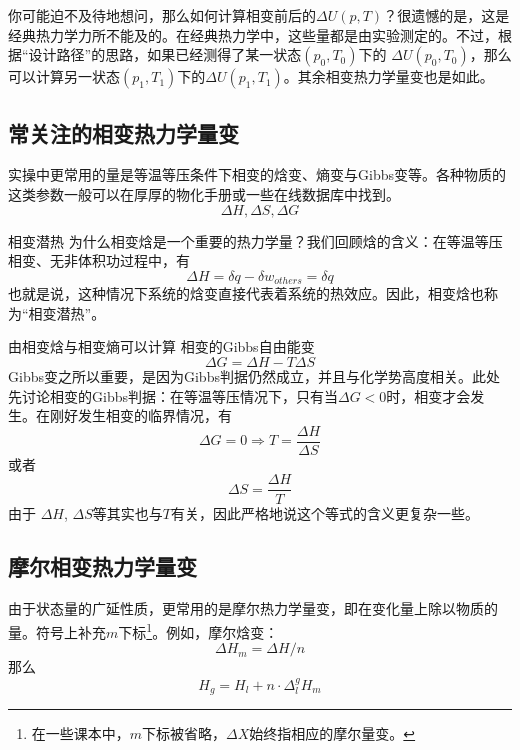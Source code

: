 你可能迫不及待地想问，那么如何计算相变前后的$\Delta U (p,T)$？很遗憾的是，这是经典热力学力所不能及的。在经典热力学中，这些量都是由实验测定的。不过，根据“设计路径”的思路，如果已经测得了某一状态$(p_0,T_0)$下的 $\Delta U (p_0,T_0)$，那么可以计算另一状态$(p_1,T_1)$下的$\Delta U (p_1,T_1)$。其余相变热力学量变也是如此。

\subsection{常关注的相变热力学量变}
实操中更常用的量是等温等压条件下相变的焓变、熵变与Gibbs变等。各种物质的这类参数一般可以在厚厚的物化手册或一些在线数据库中找到。
$$
\Delta H, \Delta  S, \Delta G
$$

\begin{example}{相变潜热}
为什么相变焓是一个重要的热力学量？我们回顾焓的含义：在等温等压相变、无非体积功过程中，有
$$
\Delta H = \delta q - \delta w_{others} = \delta q
$$
也就是说，这种情况下系统的焓变直接代表着系统的热效应。因此，相变焓也称为“相变潜热”。
\end{example}

由相变焓与相变熵可以计算 相变的Gibbs自由能变
$$
\Delta G = \Delta H - T \Delta S
$$
Gibbs变之所以重要，是因为Gibbs判据仍然成立，并且与化学势高度相关。此处先讨论相变的Gibbs判据：在等温等压情况下，只有当$\Delta G<0$时，相变才会发生。在刚好发生相变的临界情况，有
$$
\Delta G = 0 \Rightarrow T = \frac{\Delta H}{\Delta S}
$$
或者
$$
\Delta S = \frac{\Delta H}{T}
$$
由于 $\Delta H$, $\Delta S$等其实也与$T$有关，因此严格地说这个等式的含义更复杂一些。

\subsection{摩尔相变热力学量变}
由于状态量的广延性质，更常用的是摩尔热力学量变，即在变化量上除以物质的量。符号上补充$m$下标\footnote{在一些课本中，$m$下标被省略，$\Delta X$始终指相应的摩尔量变。}。例如，摩尔焓变：
$$
\Delta H_m = \Delta H / n
$$
那么
$$
H_g = H_l + n \cdot \Delta^g_l H_m
$$
